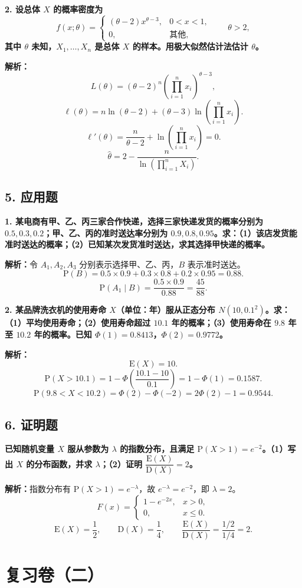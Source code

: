 ﻿\documentclass[UTF8,11pt,a4paper]{ctexart}
\newcommand{\Pp}{\mathrm{P}}
\newcommand{\E}{\mathrm{E}}
\newcommand{\D}{\mathrm{D}}
\newcommand{\Ana}[1]{\par\textbf{解析：}#1\par\medskip}
\newcommand{\Q}[1]{\par\textbf{#1}\par}
\begin{document}
\Q{2. 设总体 $X$ 的概率密度为
\[
f(x;\theta)=\begin{cases}(\theta-2)x^{\theta-3},&0<x<1,\\0,&\text{其他},\end{cases}\qquad \theta>2,
\]
其中 $\theta$ 未知，$X_1,\ldots,X_n$ 是总体 $X$ 的样本。用极大似然估计法估计 $\theta$。}
\Ana{
\[
L(\theta)=(\theta-2)^n\left(\prod_{i=1}^n x_i\right)^{\theta-3},
\]
\[
\ell(\theta)=n\ln(\theta-2)+(\theta-3)\ln\left(\prod_{i=1}^n x_i\right).
\]
\[
\ell'(\theta)=\frac{n}{\theta-2}+\ln\left(\prod_{i=1}^n x_i\right)=0.
\]
\[
\hat\theta=2-\frac{n}{\ln\left(\prod_{i=1}^nX_i\right)}.
\]}

\subsection*{5. 应用题}
\Q{1. 某电商有甲、乙、丙三家合作快递，选择三家快递发货的概率分别为 $0.5,0.3,0.2$；甲、乙、丙的准时送达率分别为 $0.9,0.8,0.95$。求：（1）该店发货能准时送达的概率；（2）已知某次发货准时送达，求其选择甲快递的概率。}
\Ana{令 $A_1,A_2,A_3$ 分别表示选择甲、乙、丙，$B$ 表示准时送达。
\[
\Pp(B)=0.5\times0.9+0.3\times0.8+0.2\times0.95=0.88.
\]
\[
\Pp(A_1\mid B)=\frac{0.5\times0.9}{0.88}=\frac{45}{88}.
\]}

\Q{2. 某品牌洗衣机的使用寿命 $X$（单位：年）服从正态分布 $N(10,0.1^2)$。求：（1）平均使用寿命；（2）使用寿命超过 $10.1$ 年的概率；（3）使用寿命在 $9.8$ 年至 $10.2$ 年的概率。已知 $\Phi(1)=0.8413$，$\Phi(2)=0.9772$。}
\Ana{
\[
\E(X)=10.
\]
\[
\Pp(X>10.1)=1-\Phi\left(\frac{10.1-10}{0.1}\right)=1-\Phi(1)=0.1587.
\]
\[
\Pp(9.8<X<10.2)=\Phi(2)-\Phi(-2)=2\Phi(2)-1=0.9544.
\]}

\subsection*{6. 证明题}
\Q{已知随机变量 $X$ 服从参数为 $\lambda$ 的指数分布，且满足 $\Pp(X>1)=e^{-2}$。（1）写出 $X$ 的分布函数，并求 $\lambda$；（2）证明 $\dfrac{\E(X)}{\D(X)}=2$。}
\Ana{指数分布有 $\Pp(X>1)=e^{-\lambda}$，故 $e^{-\lambda}=e^{-2}$，即 $\lambda=2$。
\[
F(x)=\begin{cases}1-e^{-2x},&x>0,\\0,&x\le0.\end{cases}
\]
\[
\E(X)=\frac12,\qquad \D(X)=\frac14,\qquad \frac{\E(X)}{\D(X)}=\frac{1/2}{1/4}=2.
\]}

\newpage
\section*{复习卷（二）}
\end{document}
